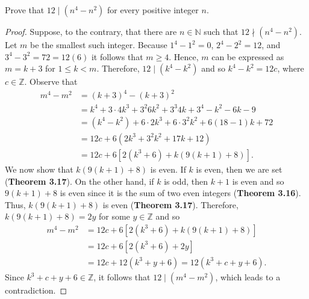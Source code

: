 \documentclass[12pt]{article}
\newcommand{\N}{\mathbb{N}}
\newcommand{\Z}{\mathbb{Z}}
\newenvironment{problem}[2][Problem]{\begin{trivlist}
		\item[\hskip \labelsep {\bfseries #1}\hskip \labelsep {\bfseries #2.}]}{\end{trivlist}}
\begin{document}
\begin{problem}{39}
	Prove that $12\mid \left(n^{4}-n^{2}\right)$ for every positive integer $n$.
	\begin{proof} 
		Suppose, to the contrary, that there are $n\in \N$ such that $12\nmid \left(n^{4}-n^{2}\right)$. Let $m$ be the smallest such integer. Because $1^{4}-1^{2} = 0$, $2^{4}-2^{2} = 12$, and $3^{4}-3^{2} = 72 = 12(6)$ it follows that $m\geq 4$. Hence, $m$ can be expressed as $m=k+3$ for $1\leq k < m$. Therefore, $12\mid \left(k^{4}-k^{2}\right)$ and so $k^{4}-k^{2} = 12c$, where $c\in \Z$. Observe that
		\begin{align*} 
			m^{4} - m^{2} &= \left(k+3\right)^{4} - \left(k+3\right)^{2}\\
			&= k^{4}+3\cdot4k^{3}+3^{2}6k^{2}+3^{3}4k + 3^{4} -k^{2}-6k-9\\
			&= \left(k^{4}-k^{2}\right)+6\cdot 2k^{3} + 6\cdot 3^{2} k^{2} + 6(18-1)k+72\\
			&= 12c + 6\left(2k^{3}+3^{2}k^{2}+17k+12\right)\\
			&= 12c +6\left[2\left(k^{3}+6\right)+k\left(9(k+1)+8\right)\right].
		\end{align*}
	We now show that $k\left(9(k+1)+8\right)$ is even. If $k$ is even, then we are set (\textbf{Theorem 3.17}). On the other hand, if $k$ is odd, then $k+1$ is even and so $9(k+1)+8$ is even since it is the sum of two even integers (\textbf{Theorem 3.16}). Thus, $k\left(9(k+1)+8\right)$ is even (\textbf{Theorem 3.17}). Therefore, $k\left(9(k+1)+8\right) = 2y$ for some $y\in \Z$ and so
	\begin{align*}
		m^{4} - m^{2} &= 12c +6\left[2\left(k^{3}+6\right)+k\left(9(k+1)+8\right)\right]\\
		&= 12c + 6\left[2\left(k^{3}+6\right)+2y\right]\\
		&= 12c + 12\left(k^{3}+y+6\right) = 12\left(k^{3}+c+y+6\right).
	\end{align*}
Since $k^{3}+c+y+6 \in \Z$, it follows that $12\mid (m^{4} - m^{2})$, which leads to a contradiction. 
	\end{proof}
\end{problem}
\end{document}
